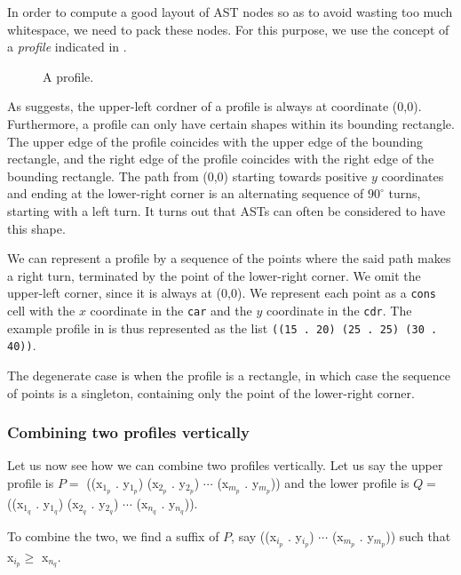 In order to compute a good layout of AST nodes so as to avoid wasting
too much whitespace, we need to pack these nodes.  For this purpose,
we use the concept of a \emph{profile} indicated in
.

\begin{figure}
\begin{center}
\end{center}
\caption{\label{fig-profile}
A profile.}
\end{figure}

As  suggests, the upper-left cordner of a profile
is always at coordinate (0,0).  Furthermore, a profile can only have
certain shapes within its bounding rectangle.  The upper edge of the
profile coincides with the upper edge of the bounding rectangle, and
the right edge of the profile coincides with the right edge of the
bounding rectangle.  The path from (0,0) starting towards positive $y$
coordinates and ending at the lower-right corner is an alternating
sequence of $90^\circ$ turns, starting with a left turn.  It turns out
that ASTs can often be considered to have this shape.

We can represent a profile by a sequence of the points where the said
path makes a right turn, terminated by the point of the lower-right
corner.  We omit the upper-left corner, since it is always at (0,0).
We represent each point as a \texttt{cons} cell with the $x$
coordinate in the \texttt{car} and the $y$ coordinate in the
\texttt{cdr}.  The example profile in  is thus
represented as the list \texttt{((15 . 20) (25 . 25) (30 . 40))}.

The degenerate case is when the profile is a rectangle, in which case
the sequence of points is a singleton, containing only the point of
the lower-right corner.

\subsubsection{Combining two profiles vertically}

Let us now see how we can combine two profiles vertically.  Let us say
the upper profile is $P = $ ((x$_{1_p}$ . y$_{1_p}$) (x$_{2_p}$
. y$_{2_p}$) $\cdots$ (x$_{m_p}$ . y$_{m_p}$)) and the lower profile
is $Q = $ ((x$_{1_q}$ . y$_{1_q}$) (x$_{2_q}$ . y$_{2_q}$) $\cdots$
(x$_{n_q}$ . y$_{n_q}$)).

To combine the two, we find a suffix of $P$, say ((x$_{i_p}$
. y$_{i_p}$) $\cdots$ (x$_{m_p}$ . y$_{m_p}$)) such that x$_{i_p} \ge $
x$_{n_q}$.

